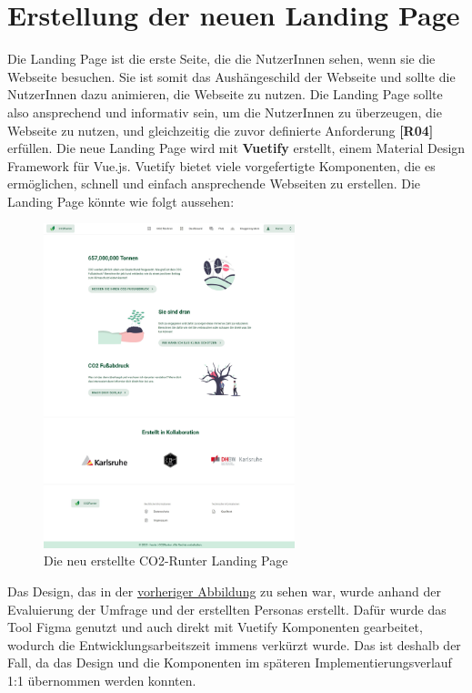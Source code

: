 
\section{Erstellung der neuen Landing Page}

Die Landing Page ist die erste Seite, die die NutzerInnen sehen, wenn sie die Webseite besuchen. Sie ist somit das Aushängeschild der Webseite und sollte die NutzerInnen dazu animieren, die Webseite zu nutzen. Die Landing Page sollte also ansprechend und informativ sein, um die NutzerInnen zu überzeugen, die Webseite zu nutzen, und gleichzeitig die zuvor definierte Anforderung \textbf{[R04]} erfüllen. Die neue Landing Page wird mit \textbf{Vuetify} erstellt, einem Material Design Framework für Vue.js. Vuetify bietet viele vorgefertigte Komponenten, die es ermöglichen, schnell und einfach ansprechende Webseiten zu erstellen. Die Landing Page könnte wie folgt aussehen:

\begin{figure}[H]
    \centering
    \includegraphics[width=0.65\textwidth]{images/06/HomePage-Design.jpeg}
    \caption{Die neu erstellte CO2-Runter Landing Page}
    \label{fig:new-co2runter-homepage-design}
\end{figure}

Das Design, das in der \hyperref[fig:new-co2runter-homepage-design]{vorheriger Abbildung} zu sehen war, wurde anhand der Evaluierung der Umfrage und der erstellten Personas erstellt. Dafür wurde das Tool Figma genutzt und auch direkt mit Vuetify Komponenten gearbeitet, wodurch die Entwicklungsarbeitszeit immens verkürzt wurde. Das ist deshalb der Fall, da das Design und die Komponenten im späteren Implementierungsverlauf 1:1 übernommen werden konnten.

